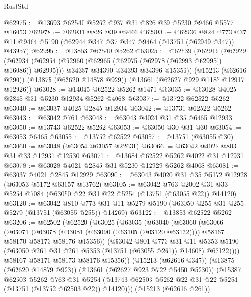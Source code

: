 \begin{lexlean}{RustStd}
\begin{coremodule}
@62975 := @13693 @62540 @5262 @937 @31 @826 @39 @5230 @9466 @5577 @16053
@62978 := @62931 @826 @39 @9466
@62993 := @62936
    @824
    @773
    @37
    @11
    @9464
    @5190
    (@62944 @347 @37 @347 @9464 (@13751 (@62949 @347)) @43957)
@62995 := @13853 @62540 @5262
@63025 := @62539
    (@62919
      (@62929
        (@62934 (@62954 (@62960 (@62965 (@62975 (@62978 (@62993 @62995)) @16086)) @62995)))
        @34387
        @34390
        @34393
        @34396
        @15356))
    (@15213 (@62616 @290))
    (@13875 (@62620 @14878 @929))
    (@13661 (@62627 @929 @1187 @12917 @12926))
@63028 := @14045 @62522 @5262 @1471
@63035 := @63028 @4025 @2845 @31 @5230 @12934 @5262 @4068
@63037 := @13722 @62522 @5262
@63040 := @63037 @4025 @2845 @12934
@63042 := @13731 @62522 @5262
@63043 := @63042 @761
@63048 := @63043 @4024 @31 @35 @6465 @12933
@63050 := @13743 @62522 @5262
@63053 := @63050 @30 @31 @30
@63054 := @63053 @6465
@63055 := @13752 @62522
@63057 := @13751 (@63055 @30)
@63060 := @63048 (@63054 @63057 @22631)
@63066 := @63042 @4022 @803 @31 @33 @12931 @12530
@63071 := @13684 @62522 @5262 @4022 @31 @12931
@63078 := @63028 @4021 @2845 @31 @5230 @12929 @5262 @4068
@63081 := @63037 @4021 @2845 @12929
@63090 := @63043 @4020 @31 @35 @5172 @12928 (@63053 @5172 @63057 @13762)
@63105 := @63042
    @763
    @2002
    @31
    @33
    @5254
    @7084
    (@63050 @22 @31 @22 @5254 (@13751 (@63055 @22)) @14120)
@63120 := @63042
    @810
    @773
    @31
    @11
    @5279
    @5190
    (@63050 @255 @31 @255 @5279 (@13751 (@63055 @255)) @14269)
@63122 := @13853 @62522 @5262
@63206 := @62502
    (@62520
      (@63025
        (@63035
          (@63040
            (@63060
              (@63066
                (@63071
                  (@63078
                    (@63081 (@63090 (@63105 (@63120 @63122))))
                    @58167
                    @58170
                    @58173
                    @58176
                    @15356))
                (@63042
                  @801
                  @773
                  @31
                  @11
                  @5353
                  @5190
                  (@63050 @261 @31 @261 @5353 (@13751 (@63055 @261)) @14608)
                  @63122))))
          @58167
          @58170
          @58173
          @58176
          @15356))
      (@15213 (@62616 @347))
      (@13875 (@62620 @14879 @923))
      (@13661 (@62627 @923 @722 @5450 @5230))
      (@15387
        @62503
        @5262
        @763
        @31
        @5254
        (@13743 @62503 @5262 @22 @31 @22 @5254 (@13751 (@13752 @62503 @22)) @14120)))
    (@15213 (@62616 @261))

\end{coremodule}
\end{lexlean}
